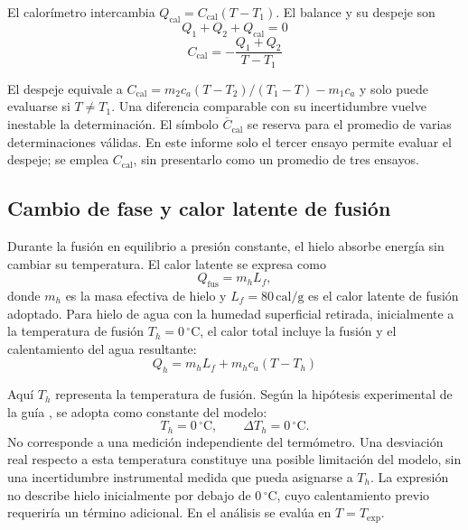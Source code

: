 El calorímetro intercambia $Q_{\mathrm{cal}}=C_{\mathrm{cal}}(T-T_1)$. El balance y su despeje son
\begin{equation}
    Q_1+Q_2+Q_{\mathrm{cal}}=0
    \label{eq:balance_calorimetro}
\end{equation}
\begin{equation}
    C_{\mathrm{cal}}=
    -\frac{Q_1+Q_2}{T-T_1}
    \label{eq:capacidad_calorimetro}
\end{equation}

El despeje equivale a $C_{\mathrm{cal}}=m_2c_a(T-T_2)/(T_1-T)-m_1c_a$ y solo puede evaluarse si $T\ne T_1$. Una diferencia comparable con su incertidumbre vuelve inestable la determinación. El símbolo $\overline{C}_{\mathrm{cal}}$ se reserva para el promedio de varias determinaciones válidas. En este informe solo el tercer ensayo permite evaluar el despeje; se emplea $C_{\mathrm{cal}}$, sin presentarlo como un promedio de tres ensayos.

\subsection{Cambio de fase y calor latente de fusión}
Durante la fusión en equilibrio a presión constante, el hielo absorbe energía sin cambiar su temperatura. El calor latente se expresa como \cite{serway}
\begin{equation}
  Q_{\mathrm{fus}}=m_hL_f,
  \label{eq:latente}
\end{equation}
donde $m_h$ es la masa efectiva de hielo y $L_f=80\,\mathrm{cal}/\mathrm{g}$ es el calor latente de fusión adoptado. Para hielo de agua con la humedad superficial retirada, inicialmente a la temperatura de fusión $T_h=0\,{}^{\circ}\mathrm{C}$, el calor total incluye la fusión y el calentamiento del agua resultante:
\begin{equation}
    Q_h=m_hL_f+m_hc_a(T-T_h)
    \label{eq:calor_hielo}
\end{equation}

Aquí $T_h$ representa la temperatura de fusión. Según la hipótesis experimental de la guía \cite{guiauca4}, se adopta como constante del modelo:
\begin{equation}
  T_h=0\,{}^{\circ}\mathrm{C},\qquad \Delta T_h=0\,{}^{\circ}\mathrm{C}.
  \label{eq:hipotesis_temperatura_hielo}
\end{equation}
No corresponde a una medición independiente del termómetro. Una desviación real respecto a esta temperatura constituye una posible limitación del modelo, sin una incertidumbre instrumental medida que pueda asignarse a $T_h$. La expresión no describe hielo inicialmente por debajo de $0\,{}^{\circ}\mathrm{C}$, cuyo calentamiento previo requeriría un término adicional. En el análisis se evalúa en $T=T_{\mathrm{exp}}$.

